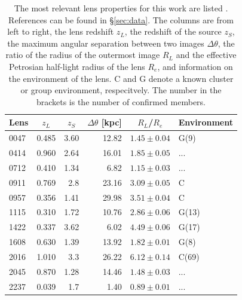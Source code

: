 \documentclass[useAMS,usenatbib]{mn2e}
\begin{document}
\begin{table}
  \begin{center}
    \begin{tabular}{l r r r r l}
      Lens    & \multicolumn{1}{c}{$z_{L}$} & \multicolumn{1}{c}{$z_{S}$} & \multicolumn{1}{c}{$\Delta\theta$ [kpc]} & \multicolumn{1}{c}{$R_{L}$/$R_{e}$} & Environment \\ \hline
      0047 & 0.485 & 3.60 & 12.82 & $1.45\pm0.04$ & G(9) \\
      0414 & 0.960 & 2.64 & 16.01 & $1.85\pm0.05$ & ... \\
      0712 & 0.410 & 1.34 & 6.82  & $1.15\pm0.03$ & ... \\
      0911 & 0.769 & 2.8  & 23.16 & $3.09\pm0.05$ & C \\
      0957 & 0.356 & 1.41 & 29.98 & $3.51\pm0.04$ & C \\
      1115 & 0.310 & 1.72 & 10.76 & $2.86\pm0.06$ & G(13) \\
      1422 & 0.337 & 3.62 & 6.02  & $4.49\pm0.06$ & G(17) \\
      1608 & 0.630 & 1.39 & 13.92 & $1.82\pm0.01$ & G(8) \\
      2016 & 1.010 & 3.3  & 26.22 & $6.12\pm0.14$ & C(69) \\
      2045 & 0.870 & 1.28 & 14.46 & $1.48\pm0.03$ & ... \\
      2237 & 0.039 & 1.7  & 1.40  & $0.89\pm0.01$ & ... \\
    \end{tabular}
    \caption[width=\linewidth]{The most relevant lens properties for this work are listed \citep[for an expanded version of this table see][]{2011ApJ...740...97L}. References can be found in \S\ref{sec:data}. The columns are from left to right, the lens redshift $z_L$, the redshift of the source $z_S$, the maximum angular separation between two images $\Delta\theta$, the ratio of the radius of the outermost image $R_L$ and the effective Petrosian half-light radius of the lens $R_e$, and information on the environment of the lens. C and G denote a known cluster or group environment, respecitvely. The number in the brackets is the number of confirmed members.}
    \label{tab:lensproperties}
  \end{center}
\end{table}
\end{document}
